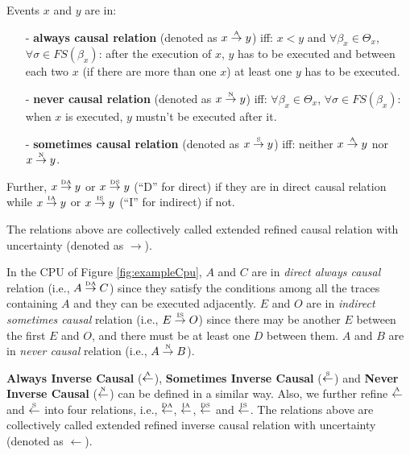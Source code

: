 \documentclass{llncs}
\begin{document}
\begin{definition}\label{def:extendedCausal}
Events $x$ and $y$ are in:
	\begin{itemize}
		\item[-] \textbf{always causal relation} (denoted as $x\overset{\text{\tiny{A}}}{\rightarrow}y$) iff: $x<y$ and $\forall\beta_{x}\in\Theta_{x}$, $\forall\sigma\in FS(\beta_{x})$: after the execution of $x$, $y$ has to be executed and between each two $x$ (if there are more than one $x$) at least one $y$ has to be executed.
		\item[-] \textbf{never causal relation} (denoted as $x\overset{\text{\tiny{N}}}{\rightarrow} y$) iff: $\forall\beta_{x}\in\Theta_{x}$, $\forall\sigma\in FS(\beta_{x})$: when $x$ is executed, $y$ mustn't be executed after it.
		\item[-] \textbf{sometimes causal relation} (denoted as $x\overset{\text{\tiny{S}}}{\rightarrow} y$) iff: neither $x\overset{\text{\tiny{A}}}{\rightarrow}y$ nor $x\overset{\text{\tiny{N}}}{\rightarrow} y$.
	\end{itemize}
	Further, $x\overset{\text{\tiny{DA}}}{\rightarrow}y$ or $x\overset{\text{\tiny{DS}}}{\rightarrow}y$ (``D'' for direct) if they are in direct causal relation while $x\overset{\text{\tiny{IA}}}{\rightarrow}y$ or $x\overset{\text{\tiny{IS}}}{\rightarrow}y$ (``I'' for indirect) if not.
\end{definition}

The relations above are collectively called extended refined causal relation with uncertainty (denoted as $\rightarrow$).

\begin{example}\label{ex:causalRelation}
In the CPU of Figure \ref{fig:exampleCpu}, $A$ and $C$ are in \textit{direct always causal} relation (i.e., $A\overset{\text{\tiny{DA}}}{\rightarrow}C$) since they satisfy the conditions among all the traces containing $A$ and they can be executed adjacently. $E$ and $O$ are in \textit{indirect sometimes causal} relation (i.e., $E\overset{\text{\tiny{IS}}}{\rightarrow}O$) since there may be another $E$ between the first $E$ and $O$, and there must be at least one $D$ between them. $A$ and $B$ are in \textit{never causal} relation (i.e., $A\overset{\text{\tiny{N}}}{\rightarrow} B$).
\end{example}

\textbf{Always Inverse Causal} ($\overset{\text{\tiny{A}}}{\leftarrow}$), \textbf{Sometimes Inverse Causal} ($\overset{\text{\tiny{S}}}{\leftarrow}$) and \textbf{Never Inverse Causal} ($\overset{\text{\tiny{N}}}{\leftarrow}$) can be defined in a similar way. Also, we further refine $\overset{\text{\tiny{A}}}{\leftarrow}$ and $\overset{\text{\tiny{S}}}{\leftarrow}$ into four relations, i.e., $\overset{\text{\tiny{DA}}}{\leftarrow}$, $\overset{\text{\tiny{IA}}}{\leftarrow}$, $\overset{\text{\tiny{DS}}}{\leftarrow}$ and $\overset{\text{\tiny{IS}}}{\leftarrow}$. The relations above are collectively called extended refined inverse causal relation with uncertainty (denoted as $\leftarrow$).
\end{document}
